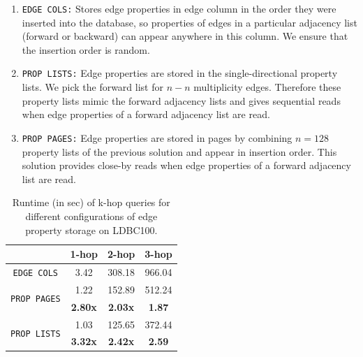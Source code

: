 \begin{enumerate}
	\item \texttt{EDGE COLS:} Stores edge properties in edge column in the order they were inserted into the database, so properties of edges in a particular adjacency list (forward or backward) can appear anywhere in this column. We ensure that the insertion order is random. %
	\item \texttt{PROP LISTS:} Edge properties are stored in the single-directional property lists. We pick the forward list for $n-n$ multiplicity edges. Therefore these property lists mimic the forward adjacency lists and gives sequential reads when edge properties of a forward adjacency list are read.
	
	\item \texttt{PROP PAGES:} Edge properties are stored in pages by combining $n=128$ property lists of the previous solution and appear in insertion order. This solution provides close-by reads when edge properties of a forward adjacency list are read.
\end{enumerate}

\begin{table}
	\centering
	\bgroup
	\setlength{\tabcolsep}{8pt}
	\def\arraystretch{1.2}%
	\begin{tabular}{ |c|c|c|c| } 
		\hline
		& \textbf{1-hop} & \textbf{2-hop} & \textbf{3-hop} \\
		\hline \hline
		\texttt{EDGE COLS}& 3.42 & 308.18 & 966.04\\ 
		\hline 
		\multirow{2}{*}{\texttt{PROP PAGES}} & 1.22 & 152.89 & 512.24 \\ 
		& \textbf{2.80x} & \textbf{2.03x} & \textbf{1.87} \\ 
		\hline
		\multirow{2}{*}{\texttt{PROP LISTS}}& 1.03 & 125.65 & 372.44 \\ 
		& \textbf{3.32x} & \textbf{2.42x} & \textbf{2.59}\\ 
		\hline
	\end{tabular}
	\egroup
	\captionsetup{justification=centering}
	\caption{Runtime (in sec) of k-hop queries for different configurations of edge property storage on LDBC100.}
	\label{tbl:mem2}
\end{table}

